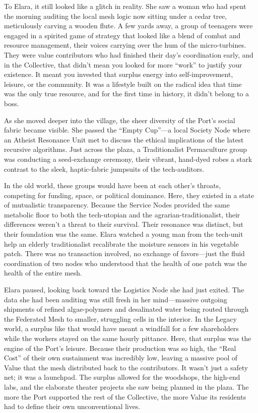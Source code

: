 To Elara, it still looked like a glitch in reality. She saw a woman who had spent the morning auditing the local mesh logic now sitting under a cedar tree, meticulously carving a wooden flute. A few yards away, a group of teenagers were engaged in a spirited game of strategy that looked like a blend of combat and resource management, their voices carrying over the hum of the micro-turbines. They were value contributors who had finished their day's coordination early, and in the Collective, that didn't mean you looked for more ``work'' to justify your existence. It meant you invested that surplus energy into self-improvement, leisure, or the community. It was a lifestyle built on the radical idea that time was the only true resource, and for the first time in history, it didn't belong to a boss.


As she moved deeper into the village, the sheer diversity of the Port's social fabric became visible. She passed the ``Empty Cup''—a local Society Node where an Atheist Resonance Unit met to discuss the ethical implications of the latest recursive algorithms. Just across the plaza, a Traditionalist Permaculture group was conducting a seed-exchange ceremony, their vibrant, hand-dyed robes a stark contrast to the sleek, haptic-fabric jumpsuits of the tech-auditors. 

In the old world, these groups would have been at each other's throats, competing for funding, space, or political dominance. Here, they existed in a state of mutualistic transparency. Because the Service Nodes provided the same metabolic floor to both the tech-utopian and the agrarian-traditionalist, their differences weren't a threat to their survival. Their resonance was distinct, but their foundation was the same. Elara watched a young man from the tech-unit help an elderly traditionalist recalibrate the moisture sensors in his vegetable patch. There was no transaction involved, no exchange of favors—just the fluid coordination of two nodes who understood that the health of one patch was the health of the entire mesh.

Elara paused, looking back toward the Logistics Node she had just exited. The data she had been auditing was still fresh in her mind—massive outgoing shipments of refined algae-polymers and desalinated water being routed through the Federated Mesh to smaller, struggling cells in the interior. In the Legacy world, a surplus like that would have meant a windfall for a few shareholders while the workers stayed on the same hourly pittance. Here, that surplus was the engine of the Port's leisure. Because their production was so high, the ``Real Cost'' of their own sustainment was incredibly low, leaving a massive pool of Value that the mesh distributed back to the contributors. It wasn't just a safety net; it was a launchpad. The surplus allowed for the woodshops, the high-end labs, and the elaborate theater projects she saw being planned in the plaza. The more the Port supported the rest of the Collective, the more Value its residents had to define their own unconventional lives.

